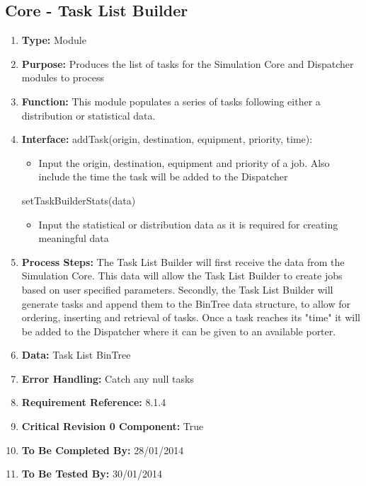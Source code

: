 \documentclass[paper=letter, fontsize=10pt]{scrartcl}
\numberwithin{equation}{section}		%
\numberwithin{figure}{section}			%
\numberwithin{table}{section}				%
\begin{document}
\subsection{Core - Task List Builder}
\begin{enumerate}[]
	\item \textbf{Type:} Module
	\item \textbf{Purpose:} Produces the list of tasks for the Simulation Core and Dispatcher modules to process
	\item \textbf{Function:} This module populates a series of tasks following either a distribution or statistical data.
	\item \textbf{Interface:} \newline
		addTask(origin, destination, equipment, priority, time):
		\begin{itemize}
			\item Input the origin, destination, equipment and priority of a job.  Also include the time the task will be added to the Dispatcher
		\end{itemize}
		setTaskBuilderStats(data)
		\begin{itemize}
			\item Input the statistical or distribution data as it is required for creating meaningful data
		\end{itemize}
		
	\item \textbf{Process Steps:} The Task List Builder will first receive the data from the Simulation Core.  This data will allow the Task List Builder to create jobs based on user specified parameters.  Secondly, the Task List Builder will generate tasks and append them to the BinTree data structure, to allow for ordering, inserting and retrieval of tasks.  Once a task reaches its "time" it will be added to the Dispatcher where it can be given to an available porter.
	\item \textbf{Data:} Task List BinTree
	\item \textbf{Error Handling:} Catch any null tasks
	\item \textbf{Requirement Reference:} 8.1.4
	\item \textbf{Critical Revision 0 Component:} True
	\item \textbf{To Be Completed By:} 28/01/2014
	\item \textbf{To Be Tested By:} 30/01/2014
\end{enumerate}
\end{document}
